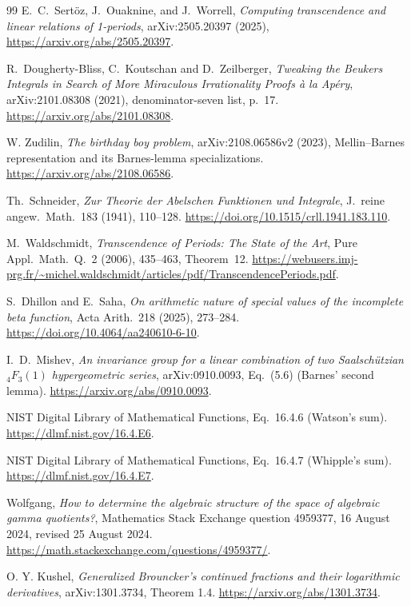 \documentclass[11pt,a4paper]{article}
\theoremstyle{definition}
\theoremstyle{remark}
\numberwithin{equation}{section}
\begin{document}
\begin{thebibliography}{99}
E.~C.~Sert\"oz, J.~Ouaknine, and J.~Worrell,
\emph{Computing transcendence and linear relations of 1-periods},
arXiv:2505.20397 (2025),
\url{https://arxiv.org/abs/2505.20397}.

R.~Dougherty-Bliss, C.~Koutschan and D.~Zeilberger,
\emph{Tweaking the Beukers Integrals in Search of More Miraculous
Irrationality Proofs \`a la Ap\'ery}, arXiv:2101.08308 (2021),
denominator-seven list, p.~17.
\url{https://arxiv.org/abs/2101.08308}.

W. Zudilin, \emph{The birthday boy problem}, arXiv:2108.06586v2 (2023),
Mellin--Barnes representation and its Barnes-lemma specializations.
\url{https://arxiv.org/abs/2108.06586}.

Th.~Schneider,
\emph{Zur Theorie der Abelschen Funktionen und Integrale},
J.~reine angew.~Math.~183 (1941), 110--128.
\url{https://doi.org/10.1515/crll.1941.183.110}.

M.~Waldschmidt,
\emph{Transcendence of Periods: The State of the Art},
Pure Appl.~Math.~Q.~2 (2006), 435--463, Theorem~12.
\url{https://webusers.imj-prg.fr/~michel.waldschmidt/articles/pdf/TranscendencePeriods.pdf}.

S.~Dhillon and E.~Saha,
\emph{On arithmetic nature of special values of the incomplete beta
function}, Acta Arith.~218 (2025), 273--284.
\url{https://doi.org/10.4064/aa240610-6-10}.

I.~D.~Mishev, \emph{An invariance group for a linear
combination of two Saalsch\"utzian $ {}_4F_3(1)$ hypergeometric series},
arXiv:0910.0093, Eq.~(5.6) (Barnes' second lemma).
\url{https://arxiv.org/abs/0910.0093}.

NIST Digital Library of Mathematical Functions,
Eq.~16.4.6 (Watson's sum).
\url{https://dlmf.nist.gov/16.4.E6}.

NIST Digital Library of Mathematical Functions,
Eq.~16.4.7 (Whipple's sum).
\url{https://dlmf.nist.gov/16.4.E7}.

Wolfgang, \emph{How to determine the algebraic structure of the space of
algebraic gamma quotients?}, Mathematics Stack Exchange question 4959377,
16 August 2024, revised 25 August 2024.
\url{https://math.stackexchange.com/questions/4959377/}.

O. Y. Kushel, \emph{Generalized Brouncker's continued fractions and their
logarithmic derivatives}, arXiv:1301.3734, Theorem 1.4.
\url{https://arxiv.org/abs/1301.3734}.


\end{thebibliography}
\end{document}
